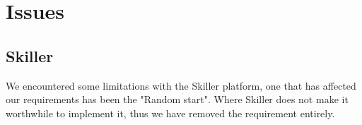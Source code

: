\section{Issues}

\subsection{Skiller}
We encountered some limitations with the Skiller platform, one that has affected our requirements has been the "Random start". Where Skiller does not make it worthwhile to implement it, thus we have removed the requirement entirely.